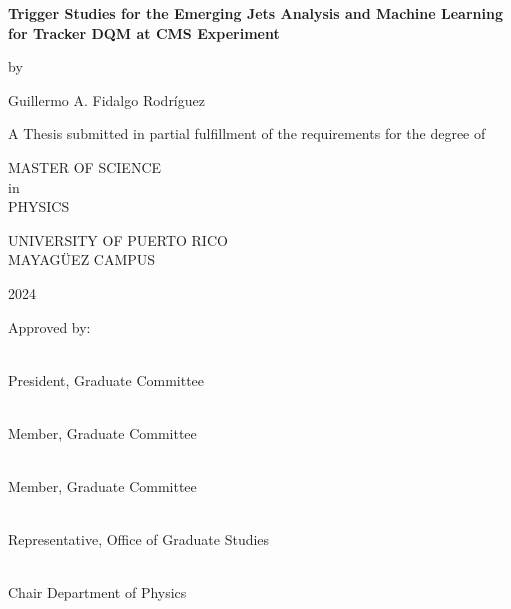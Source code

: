 \begin{titlepage}
	\begin{center}

		{\large
			\textbf{ \vspace{1mm} Trigger Studies for the Emerging Jets Analysis and Machine Learning for Tracker DQM at CMS Experiment}\\
		}

		\vspace{5mm}

		by\\

		\vspace{5mm}

		Guillermo A. Fidalgo Rodríguez

		\vspace{5mm}

		A Thesis submitted in partial fulfillment of the requirements for the degree of\\

		\vspace{5mm}

		MASTER OF SCIENCE \\
		in\\
		PHYSICS\\

		\vspace{5mm}

		UNIVERSITY OF PUERTO RICO\\
		MAYAGÜEZ CAMPUS\\

		\vspace{5mm}

		2024
	\end{center}

	\vfill

	Approved by:

	\vspace{1.0cm}

	\\President, Graduate Committee

	\vspace{1.0cm}

	\\Member, Graduate Committee
	\vspace{1.0cm}

	\\Member, Graduate Committee
	\vspace{1.0cm}


	\\Representative, Office of Graduate Studies
	\vspace{1.0cm}

	\\Chair Department of Physics

\end{titlepage}
